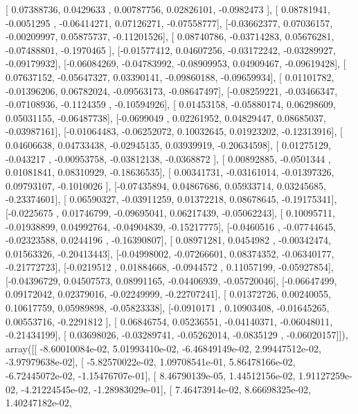 \documentclass{article}
\begin{document}
       [ 0.07388736,  0.0429633 ,  0.00787756,  0.02826101, -0.0982473 ],
       [ 0.08781941, -0.0051295 , -0.06414271,  0.07126271, -0.07558777],
       [-0.03662377,  0.07036157, -0.00209997,  0.05875737, -0.11201526],
       [ 0.08740786, -0.03714283,  0.05676281, -0.07488801, -0.1970465 ],
       [-0.01577412,  0.04607256, -0.03172242, -0.03289927, -0.09179932],
       [-0.06084269, -0.04783992, -0.08909953,  0.04909467, -0.09619428],
       [ 0.07637152, -0.05647327,  0.03390141, -0.09860188, -0.09659934],
       [ 0.01101782, -0.01396206,  0.06782024, -0.09563173, -0.08647497],
       [-0.08259221, -0.03466347, -0.07108936, -0.1124359 , -0.10594926],
       [ 0.01453158, -0.05880174,  0.06298609,  0.05031155, -0.06487738],
       [-0.0699049 ,  0.02261952,  0.04829447,  0.08685037, -0.03987161],
       [-0.01064483, -0.06252072,  0.10032645,  0.01923202, -0.12313916],
       [ 0.04606638,  0.04733438, -0.02945135,  0.03939919, -0.20634598],
       [ 0.01275129, -0.043217  , -0.00953758, -0.03812138, -0.0368872 ],
       [ 0.00892885, -0.0501344 ,  0.01081841,  0.08310929, -0.18636535],
       [ 0.00341731, -0.03161014, -0.01397326,  0.09793107, -0.1010026 ],
       [-0.07435894,  0.04867686,  0.05933714,  0.03245685, -0.23374601],
       [ 0.06590327, -0.03911259,  0.01372218,  0.08678645, -0.19175341],
       [-0.0225675 ,  0.01746799, -0.09695041,  0.06217439, -0.05062243],
       [ 0.10095711, -0.01938899,  0.04992764, -0.04904839, -0.15217775],
       [-0.0460516 , -0.07744645, -0.02323588,  0.0244196 , -0.16390807],
       [ 0.08971281,  0.0454982 , -0.00342474,  0.01563326, -0.20413443],
       [-0.04998002, -0.07266601,  0.08374352, -0.06340177, -0.21772723],
       [-0.0219512 ,  0.01884668, -0.0944572 ,  0.11057199, -0.05927854],
       [-0.04396729,  0.04507573,  0.08991165, -0.04406939, -0.05720046],
       [-0.06647499,  0.09172042,  0.02379016, -0.02249999, -0.22707241],
       [ 0.01372726,  0.00240055,  0.10617759,  0.05989898, -0.05823338],
       [-0.0910171 ,  0.10903408, -0.01645265,  0.00553716, -0.2291812 ],
       [ 0.06846754,  0.05236551, -0.04140371, -0.06048011, -0.21434199],
       [ 0.03698026, -0.03289741, -0.05262014, -0.0835129 , -0.06020157]]), array([[ -8.60010084e-02,   5.01993410e-02,  -6.46849149e-02,
          2.99447512e-02,  -3.97979638e-02],
       [ -5.82570022e-02,   1.09708541e-01,   5.86478166e-02,
         -6.72445072e-02,  -1.15476707e-01],
       [  8.46790139e-05,   1.44512156e-02,   1.91127259e-02,
         -4.21224545e-02,  -1.28983029e-01],
       [  7.46473914e-02,   8.66698325e-02,   1.40247182e-02,
\end{document}
